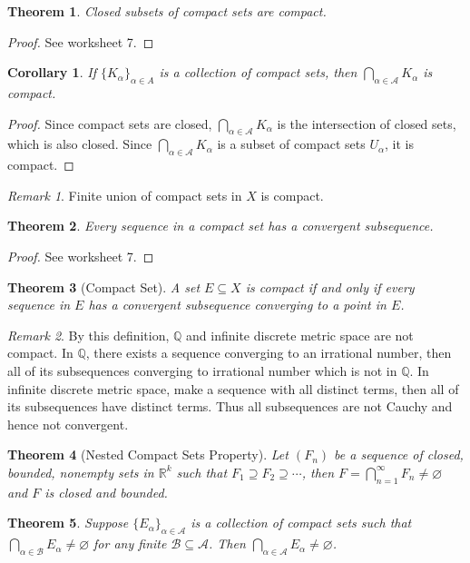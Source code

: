 \documentclass[12pt, lettersize]{article}
\theoremstyle{plain}
\newtheorem{thm}{Theorem}[section]
\newtheorem{cor}{Corollary}[thm]
\theoremstyle{definition}
\theoremstyle{remark}
\newtheorem*{rem}{Remark}
\newcommand{\R}{\mathbb{R}}
\newcommand{\Q}{\mathbb{Q}}
\let\emptyset\varnothing
\begin{document}
\begin{thm}
	Closed subsets of compact sets are compact.
\end{thm}
\begin{proof}
	See worksheet 7.
\end{proof}
\begin{cor}
	If $\{K_\alpha\}_{\alpha\in A}$ is a collection of compact sets, then $\bigcap_{\alpha\in\mathcal{A}}K_\alpha$ is compact.
\end{cor}
\begin{proof}
	Since compact sets are closed, $\bigcap_{\alpha\in\mathcal{A}}K_\alpha$ is the intersection of closed sets, which is also closed. Since $\bigcap_{\alpha\in\mathcal{A}}K_\alpha$ is a subset of compact sets $U_\alpha$, it is compact.
\end{proof}
\begin{rem}
	Finite union of compact sets in $X$ is compact.
\end{rem}

\begin{thm}
	Every sequence in a compact set has a convergent subsequence.
\end{thm}
\begin{proof}
	See worksheet 7.
\end{proof}

\begin{thm}[Compact Set]
	A set $E\subseteq X$ is compact if and only if every sequence in $E$ has a convergent subsequence converging to a point in $E$.
\end{thm}
\begin{rem}
	By this definition, $\Q$ and infinite discrete metric space are not compact. In $\Q$, there exists a sequence converging to an irrational number, then all of its subsequences converging to irrational number which is not in $\Q$. In infinite discrete metric space, make a sequence with all distinct terms, then all of its subsequences have distinct terms. Thus all subsequences are not Cauchy and hence not convergent.
\end{rem}

\begin{thm}[Nested Compact Sets Property]
	Let $(F_n)$ be a sequence of closed, bounded, nonempty sets in $\R^k$ such that $F_1\supseteq F_2\supseteq\cdots$, then $F=\bigcap_{n=1}^{\infty}F_n\neq\emptyset$ and $F$ is closed and bounded.
\end{thm}

\begin{thm}
	Suppose $\{E_\alpha\}_{\alpha\in\mathcal{A}}$ is a collection of compact sets such that $\bigcap_{\alpha\in\mathcal{B}}E_\alpha\neq\emptyset$ for any finite $\mathcal{B}\subseteq \mathcal{A}$. Then $\bigcap_{\alpha\in\mathcal{A}}E_\alpha\neq\emptyset$.
\end{thm}
\end{document}
